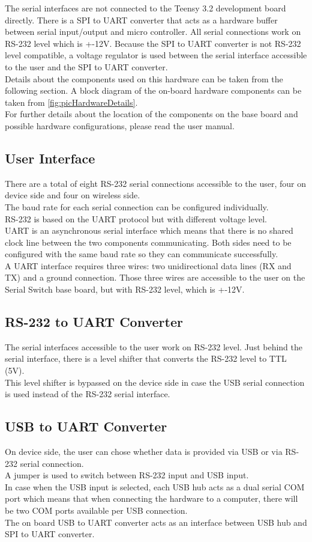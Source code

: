 The serial interfaces are not connected to the Teensy 3.2 development board directly. There is a SPI to UART converter that acts as a hardware buffer between serial input/output and micro controller.
All serial connections work on RS-232 level which is +-12V. Because the SPI to UART converter is not RS-232 level compatible, a voltage regulator is used between the serial interface accessible to the user and the SPI to UART converter.\\
Details about the components used on this hardware can be taken from the following section.
A block diagram of the on-board hardware components can be taken from \autoref{fig:picHardwareDetails}.\\
For further details about the location of the components on the base board and possible hardware configurations, please read the user manual.
%
%
\subsection{User Interface}
There are a total of eight RS-232 serial connections accessible to the user, four on device side and four on wireless side.\\
The baud rate for each serial connection can be configured individually. \\
RS-232 is based on the UART protocol but with different voltage level.\\
UART is an asynchronous serial interface which means that there is no shared clock line between the two components communicating. Both sides need to be configured with the same baud rate so they can communicate successfully.\\
A UART interface requires three wires: two unidirectional data lines (RX and TX) and a ground connection. Those three wires are accessible to the user on the Serial Switch base board, but with RS-232 level, which is +-12V.
%
\subsection{RS-232 to UART Converter}
The serial interfaces accessible to the user work on RS-232 level. Just behind the serial interface, there is a level shifter that converts the RS-232 level to TTL (5V). \\
This level shifter is bypassed on the device side in case the USB serial connection is used instead of the RS-232 serial interface.
%
\subsection{USB to UART Converter} \label{subsec:UsbToUartConverter}
On device side, the user can chose whether data is provided via USB or via RS-232 serial connection.\\
A jumper is used to switch between RS-232 input and USB input. \\
In case when the USB input is selected, each USB hub acts as a dual serial COM port which means that when connecting the hardware to a computer, there will be two COM ports available per USB connection. \\
The on board USB to UART converter acts as an interface between USB hub and SPI to UART converter.
%
